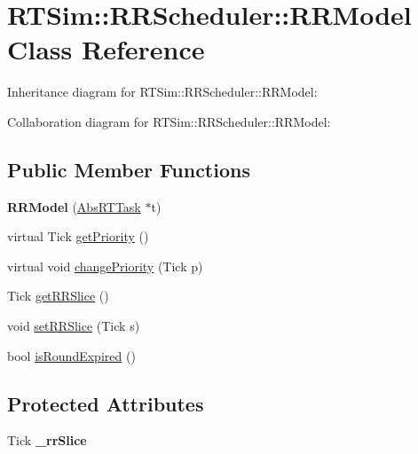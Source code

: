 \hypertarget{classRTSim_1_1RRScheduler_1_1RRModel}{}\section{R\+T\+Sim\+:\+:R\+R\+Scheduler\+:\+:R\+R\+Model Class Reference}
\label{classRTSim_1_1RRScheduler_1_1RRModel}


Inheritance diagram for R\+T\+Sim\+:\+:R\+R\+Scheduler\+:\+:R\+R\+Model\+:


Collaboration diagram for R\+T\+Sim\+:\+:R\+R\+Scheduler\+:\+:R\+R\+Model\+:
\subsection*{Public Member Functions}
\begin{DoxyCompactItemize}
\item 
{\bfseries R\+R\+Model} (\hyperlink{classRTSim_1_1AbsRTTask}{Abs\+R\+T\+Task} $\ast$t)\hypertarget{classRTSim_1_1RRScheduler_1_1RRModel_a65856a24bb7d8e643ca74fa5da87ae08}{}\label{classRTSim_1_1RRScheduler_1_1RRModel_a65856a24bb7d8e643ca74fa5da87ae08}

\item 
virtual Tick \hyperlink{classRTSim_1_1RRScheduler_1_1RRModel_a77c827848440ba7a2c1ddf239e19aeeb}{get\+Priority} ()
\item 
virtual void \hyperlink{classRTSim_1_1RRScheduler_1_1RRModel_abfbd34f75c1e911b1a3659608b53e761}{change\+Priority} (Tick p)
\item 
Tick \hyperlink{classRTSim_1_1RRScheduler_1_1RRModel_aaba2542aadf4e02f358147b46d47e4ad}{get\+R\+R\+Slice} ()
\item 
void \hyperlink{classRTSim_1_1RRScheduler_1_1RRModel_a857ba2c9f2f0b554841765325441945c}{set\+R\+R\+Slice} (Tick s)
\item 
bool \hyperlink{classRTSim_1_1RRScheduler_1_1RRModel_aa526dbb80acdf20510b69cb4034a8bca}{is\+Round\+Expired} ()
\end{DoxyCompactItemize}
\subsection*{Protected Attributes}
\begin{DoxyCompactItemize}
\item 
Tick {\bfseries \+\_\+rr\+Slice}\hypertarget{classRTSim_1_1RRScheduler_1_1RRModel_ac621dfa0225eed41c4cf32ecff93b7ca}{}\label{classRTSim_1_1RRScheduler_1_1RRModel_ac621dfa0225eed41c4cf32ecff93b7ca}

\end{DoxyCompactItemize}


